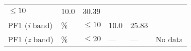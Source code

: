 \documentclass[DM,toc]{lsstdoc}
\begin{document}
\begin{longtable}[]{@{}llllll@{}}
\begin{minipage}[t]{0.17\columnwidth}
\(\leq 10\)\strut
\end{minipage} & \begin{minipage}[t]{0.17\columnwidth}\raggedright\strut
10.0\strut
\end{minipage} & \begin{minipage}[t]{0.12\columnwidth}\raggedright\strut
30.39\strut
\end{minipage} & \begin{minipage}[t]{0.17\columnwidth}\raggedright\strut
\strut
\end{minipage}\tabularnewline
\begin{minipage}[t]{0.14\columnwidth}\raggedright\strut
PF1 (\emph{i} band)\strut
\end{minipage} & \begin{minipage}[t]{0.06\columnwidth}\raggedright\strut
\%\strut
\end{minipage} & \begin{minipage}[t]{0.17\columnwidth}\raggedright\strut
\(\leq 10\)\strut
\end{minipage} & \begin{minipage}[t]{0.17\columnwidth}\raggedright\strut
10.0\strut
\end{minipage} & \begin{minipage}[t]{0.12\columnwidth}\raggedright\strut
25.83\strut
\end{minipage} & \begin{minipage}[t]{0.17\columnwidth}\raggedright\strut
\strut
\end{minipage}\tabularnewline
\begin{minipage}[t]{0.14\columnwidth}\raggedright\strut
PF1 (\emph{z} band)\strut
\end{minipage} & \begin{minipage}[t]{0.06\columnwidth}\raggedright\strut
\%\strut
\end{minipage} & \begin{minipage}[t]{0.17\columnwidth}\raggedright\strut
\(\leq 20\)\strut
\end{minipage} & \begin{minipage}[t]{0.17\columnwidth}\raggedright\strut
---\strut
\end{minipage} & \begin{minipage}[t]{0.12\columnwidth}\raggedright\strut
---\strut
\end{minipage} & \begin{minipage}[t]{0.17\columnwidth}\raggedright\strut
No data\strut
\end{minipage}\tabularnewline

\end{longtable}
\end{document}
